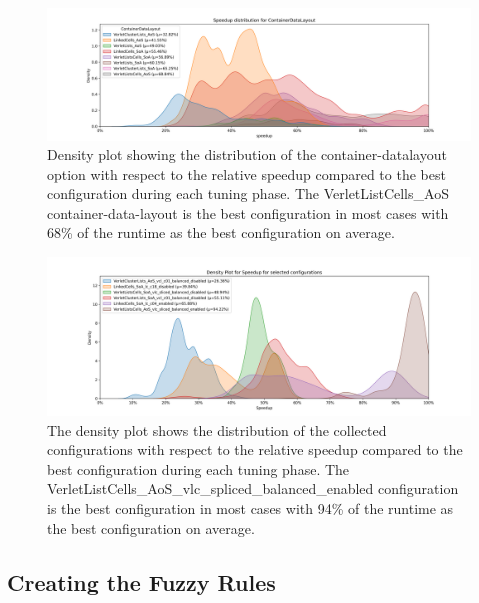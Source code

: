 \begin{figure}[H]
    \centering
    \includegraphics[width=\columnwidth,trim={1cm 0 2cm 1.5cm},clip]{figures/DataAnalytics/speedup_ContainerDataLayout.png}
    \caption[Speedup density plot of Configuration-Datalayout option]{Density plot showing the distribution of the container-datalayout option with respect to the relative speedup compared to the best configuration during each tuning phase. The VerletListCells\_AoS container-data-layout is the best configuration in most cases with 68\% of the runtime as the best configuration on average.}
    \label{fig:inputAnalysisDensityDatalayout}
\end{figure}


\begin{figure}[H]
    \centering
    \includegraphics[width=\columnwidth,trim={1cm 0 2cm 1.5cm},clip]{figures/DataAnalytics/speedup_density_configurations.png}
    \caption[Speedup density plot of configurations]{The density plot shows the distribution of the collected configurations with respect to the relative speedup compared to the best configuration during each tuning phase. The VerletListCells\_AoS\_vlc\_spliced\_balanced\_enabled configuration is the best configuration in most cases with 94\% of the runtime as the best configuration on average.}
    \label{fig:inputAnalysisDensityConfigurations}
\end{figure}

\subsection{Creating the Fuzzy Rules}

